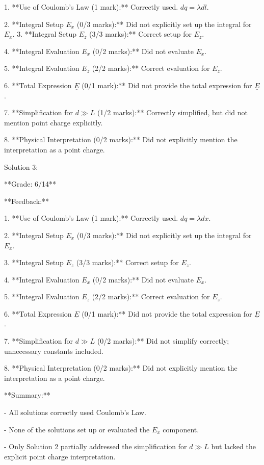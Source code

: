 \documentclass[a4paper,11pt]{article}
\begin{document}
1. **Use of Coulomb's Law (1 mark):** Correctly used. \( dq = \lambda dl \).

2. **Integral Setup \( E_x \) (0/3 marks):** Did not explicitly set up the integral for \( E_x \).
3. **Integral Setup \( E_z \) (3/3 marks):** Correct setup for \( E_z \).

4. **Integral Evaluation \( E_x \) (0/2 marks):** Did not evaluate \( E_x \).

5. **Integral Evaluation \( E_z \) (2/2 marks):** Correct evaluation for \( E_z \).

6. **Total Expression \( \underline{E} \) (0/1 mark):** Did not provide the total expression for \( \underline{E} \).

7. **Simplification for \( d \gg L \) (1/2 marks):** Correctly simplified, but did not mention point charge explicitly.

8. **Physical Interpretation (0/2 marks):** Did not explicitly mention the interpretation as a point charge.

Solution 3:

**Grade: 6/14**

**Feedback:**

1. **Use of Coulomb's Law (1 mark):** Correctly used. \( dq = \lambda dx \).

2. **Integral Setup \( E_x \) (0/3 marks):** Did not explicitly set up the integral for \( E_x \).

3. **Integral Setup \( E_z \) (3/3 marks):** Correct setup for \( E_z \).

4. **Integral Evaluation \( E_x \) (0/2 marks):** Did not evaluate \( E_x \).

5. **Integral Evaluation \( E_z \) (2/2 marks):** Correct evaluation for \( E_z \).

6. **Total Expression \( \underline{E} \) (0/1 mark):** Did not provide the total expression for \( \underline{E} \).

7. **Simplification for \( d \gg L \) (0/2 marks):** Did not simplify correctly; unnecessary constants included.

8. **Physical Interpretation (0/2 marks):** Did not explicitly mention the interpretation as a point charge.

**Summary:**

- All solutions correctly used Coulomb's Law.

- None of the solutions set up or evaluated the \( E_x \) component.

- Only Solution 2 partially addressed the simplification for \( d \gg L \) but lacked the explicit point charge interpretation.
\end{document}
